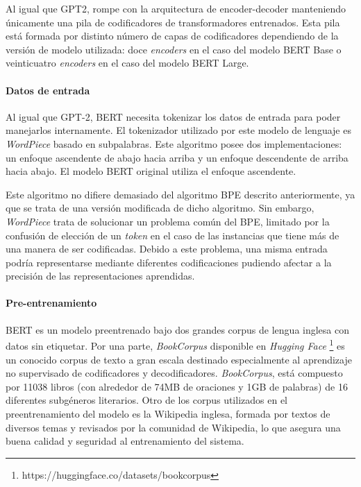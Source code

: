 Al igual que GPT2, rompe con la arquitectura de encoder-decoder manteniendo únicamente una pila de codificadores de transformadores entrenados. Esta pila está formada por distinto número de capas de codificadores dependiendo de la versión de modelo utilizada: doce \textit{encoders} en el caso del modelo BERT Base o veinticuatro \textit{encoders} en el caso del modelo BERT Large. 


\paragraph{Datos de entrada}\hfill

Al igual que GPT-2, BERT necesita tokenizar los datos de entrada para poder manejarlos internamente. El tokenizador utilizado por este modelo de lenguaje es \textit{WordPiece} \citep{wordpiece} basado en subpalabras. Este algoritmo posee dos implementaciones: un enfoque ascendente de abajo hacia arriba y un enfoque descendente de arriba hacia abajo. El modelo BERT original utiliza el enfoque ascendente.

Este algoritmo no difiere demasiado del algoritmo BPE descrito anteriormente, ya que se trata de una versión modificada de dicho algoritmo. Sin embargo, \textit{WordPiece} trata de solucionar un problema común del BPE, limitado por la confusión de elección de un \textit{token} en el caso de las instancias que tiene más de una manera de ser codificadas. Debido a este problema, una misma entrada podría representarse mediante diferentes codificaciones pudiendo afectar a la precisión de las representaciones aprendidas.


\paragraph{Pre-entrenamiento}\hfill


BERT es un modelo preentrenado bajo dos grandes corpus de lengua inglesa con datos sin etiquetar. Por una parte, \textit{BookCorpus} \citep{Zhu_2015_ICCV} disponible en \textit{Hugging Face} \footnote{https://huggingface.co/datasets/bookcorpus} es un conocido corpus de texto a gran escala destinado especialmente al aprendizaje no supervisado  de codificadores y decodificadores. \textit{BookCorpus}, está compuesto por 11038 libros (con alrededor de 74MB de oraciones y 1GB de palabras) de 16 diferentes subgéneros literarios. Otro de los corpus utilizados en el preentrenamiento del modelo es la Wikipedia inglesa, formada por textos de diversos temas y revisados por la comunidad de Wikipedia, lo que asegura una buena calidad y seguridad al entrenamiento del sistema.



